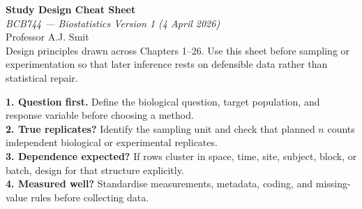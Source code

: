 \documentclass[9pt,landscape]{extarticle}
\newlength{\tableblockwidth}
\newlength{\tableoffset}
\newlength{\headerleftwidth}
\newlength{\headergap}
\newlength{\headerrightwidth}
\begin{document}
\noindent\hspace*{\tableoffset}%
\begin{minipage}{\tableblockwidth}
\begin{minipage}[t]{\headerleftwidth}
  \vspace{0pt}
  \raggedright
  {\Huge\sffamily\bfseries\color{headbg} Study Design Cheat Sheet}\\
  {\large\itshape BCB744 --- Biostatistics Version 1 (4 April 2026)}\\
  {\small Professor A.J. Smit}\\
  {\small Design principles drawn across Chapters 1--26. Use this sheet before sampling or experimentation so that later inference rests on defensible data rather than statistical repair.}
\end{minipage}%
\hspace*{\headergap}%
\begin{minipage}[t]{\headerrightwidth}
  \vspace*{-2.5mm}
  \begin{decisionbox}
    \small\sffamily
    \textbf{1. Question first.} Define the biological question, target population, and response variable before choosing a method.\\
    \textbf{2. True replicates?} Identify the sampling unit and check that planned \(n\) counts independent biological or experimental replicates.\\
    \textbf{3. Dependence expected?} If rows cluster in space, time, site, subject, block, or batch, design for that structure explicitly.\\
    \textbf{4. Measured well?} Standardise measurements, metadata, coding, and missing-value rules before collecting data.
  \end{decisionbox}
\end{minipage}
\end{minipage}

\vspace{8pt}
\end{document}
